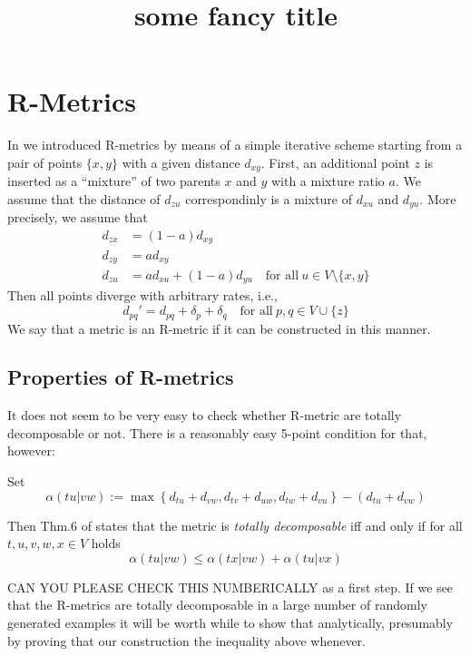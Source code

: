\documentclass{article}
\newcommand{\TODO}[1]{\begingroup\color{red}#1\endgroup}
\begin{document}
\title{\TODO{some fancy title}}

\maketitle



\section{R-Metrics} 

In \cite{Prohaska:17a} we introduced R-metrics by means of a simple
iterative scheme starting from a pair of points $\{x,y\}$ with a given
distance $d_{xy}$.  First, an additional point $z$ is inserted as a
``mixture'' of two parents $x$ and $y$ with a mixture ratio $a$. We assume
that the distance of $d_{zu}$ correspondinly is a mixture of $d_{xu}$ and
$d_{yu}$. More precisely, we assume that
\begin{equation} 
\begin{split} 
  d_{zx} & = (1-a)  d_{xy} \\
  d_{zy} & =   a    d_{xy} \\
  d_{zu} & =   a    d_{xu} + (1-a)  d_{yu} \quad\textrm{for all}\ 
                     u\in V\setminus\{ x,y \}
\end{split}
\end{equation} 
Then all points diverge with arbitrary rates, i.e., 
\begin{equation} 
  d_{pq}' = d_{pq} + \delta_p + \delta_q \quad\textrm{for all}\ 
  p,q \in V\cup\{z\} 
\end{equation} 
We say that a metric is an R-metric if it can be constructed in this
manner.


\subsection*{Properties of R-metrics} 


\TODO{It does not seem to be very easy to check whether R-metric are 
totally decomposable or not. There is a reasonably easy 5-point condition
for that, however:

Set 
\begin{equation} 
  \alpha(tu|vw) := 
  \max\left\{ d_{tu}+d_{vw}, d_{tv}+d_{uw}, d_{tw}+d_{vu} \right\} -
             (d_{tu}+d_{vw})
\end{equation} 

Then Thm.6 of \cite{Bandelt:92} states that the metric is \emph{totally
  decomposable} iff and only if for all $t,u,v,w,x\in V$ holds 
\begin{equation} 
  \alpha(tu|vw) \le \alpha(tx|vw)+\alpha(tu|vx)
\end{equation} 

CAN YOU PLEASE CHECK THIS NUMBERICALLY as a first step. If we see that the 
R-metrics are totally decomposable in a large number of randomly generated
examples it will be worth while to show that analytically, presumably by 
proving that our construction the inequality above whenever.
}
\end{document}
